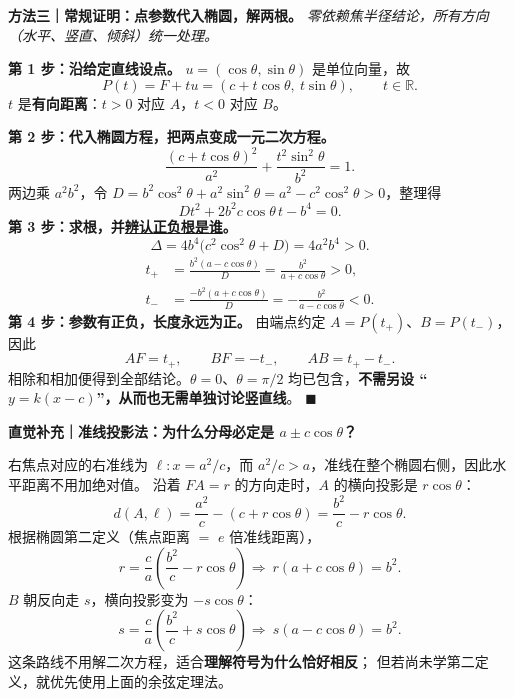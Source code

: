 \begin{proofbox}
\textbf{方法三｜常规证明：点参数代入椭圆，解两根。}\quad
\emph{零依赖焦半径结论，所有方向（水平、竖直、倾斜）统一处理。}
\par\smallskip\noindent
\textbf{第 1 步：沿给定直线设点。}
$u=(\cos\theta,\sin\theta)$ 是单位向量，故
\[
 P(t)=F+tu=(c+t\cos\theta,\ t\sin\theta),
\qquad t\in\mathbb R.
\]
$t$ 是\textbf{有向距离}：$t>0$ 对应 $A$，$t<0$ 对应 $B$。
\par\smallskip\noindent
\textbf{第 2 步：代入椭圆方程，把两点变成一元二次方程。}
\[
 \frac{(c+t\cos\theta)^2}{a^2}
 +\frac{t^2\sin^2\theta}{b^2}=1.
\]
两边乘 $a^2b^2$，令
$D=b^2\cos^2\theta+a^2\sin^2\theta
=a^2-c^2\cos^2\theta>0$，整理得
\[
 \boxed{Dt^2+2b^2c\cos\theta\,t-b^4=0}.
\]
\textbf{第 3 步：求根，并\underline{辨认正负根是谁}。}
\[
 \Delta=4b^4\bigl(c^2\cos^2\theta+D\bigr)=4a^2b^4>0.
\]
\[
 \begin{aligned}
 t_+&=\frac{b^2(a-c\cos\theta)}{D}
 =\frac{b^2}{a+c\cos\theta}>0,\\
 t_-&=\frac{-b^2(a+c\cos\theta)}{D}
 =-\frac{b^2}{a-c\cos\theta}<0.
 \end{aligned}
\]
\textbf{第 4 步：参数有正负，长度永远为正。}
由端点约定 $A=P(t_+)$、$B=P(t_-)$，因此
\[
 AF=t_+,\qquad BF=-t_-,\qquad AB=t_+-t_-.
\]
相除和相加便得到全部结论。$\theta=0$、$\theta=\pi/2$
均已包含，\textbf{不需另设 ``$y=k(x-c)$''，从而也无需单独讨论竖直线}。
\qquad$\blacksquare$
\end{proofbox}

\begin{proofbox}
\textbf{直觉补充｜准线投影法：为什么分母必定是 $a\pm c\cos\theta$？}
\par\smallskip\noindent
右焦点对应的右准线为 $\ell:x=a^2/c$，而
$a^2/c>a$，准线在整个椭圆右侧，因此水平距离不用加绝对值。
沿着 $FA=r$ 的方向走时，$A$ 的横向投影是 $r\cos\theta$：
\[
 d(A,\ell)=\frac{a^2}{c}-(c+r\cos\theta)
 =\frac{b^2}{c}-r\cos\theta.
\]
根据椭圆第二定义（焦点距离 $=$ $e$ 倍准线距离），
\[
 r=\frac ca\left(\frac{b^2}{c}-r\cos\theta\right)
 \Longrightarrow\ r(a+c\cos\theta)=b^2.
\]
$B$ 朝反向走 $s$，横向投影变为 $-s\cos\theta$：
\[
 s=\frac ca\left(\frac{b^2}{c}+s\cos\theta\right)
 \Longrightarrow\ s(a-c\cos\theta)=b^2.
\]
这条路线不用解二次方程，适合\textbf{理解符号为什么恰好相反}；
但若尚未学第二定义，就优先使用上面的余弦定理法。
\end{proofbox}
